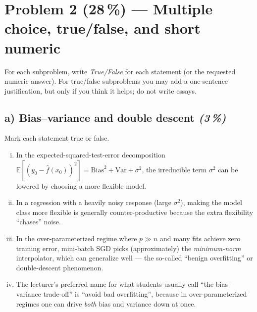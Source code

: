\documentclass[11pt,a4paper]{article}
\newcommand{\points}[1]{\textbf{(#1\,\%)}}
\newcommand{\subpoints}[1]{\textit{(#1\,\%)}}
\begin{document}
\vfill\eject

\section*{Problem 2 \points{28} --- Multiple choice, true/false, and short numeric}

For each subproblem, write \emph{True/False} for each statement (or the requested numeric answer). For true/false subproblems you may add a one-sentence justification, but only if you think it helps; do not write essays.

\subsection*{a) Bias--variance and double descent \subpoints{3}}
Mark each statement true or false.
\begin{enumerate}[(i)]
  \item In the expected-squared-test-error decomposition $\mathbb{E}[(y_0 - \hat f(x_0))^2] = \mathrm{Bias}^2 + \mathrm{Var} + \sigma^2$, the irreducible term $\sigma^2$ can be lowered by choosing a more flexible model.
  \item In a regression with a heavily noisy response (large $\sigma^2$), making the model class more flexible is generally counter-productive because the extra flexibility ``chases'' noise.
  \item In the over-parameterized regime where $p \gg n$ and many fits achieve zero training error, mini-batch SGD picks (approximately) the \emph{minimum-norm} interpolator, which can generalize well --- the so-called ``benign overfitting'' or double-descent phenomenon.
  \item The lecturer's preferred name for what students usually call ``the bias--variance trade-off'' is ``avoid bad overfitting'', because in over-parameterized regimes one can drive \emph{both} bias and variance down at once.
\end{enumerate}
\end{document}
